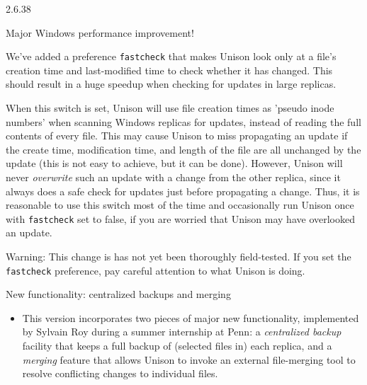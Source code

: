 \begin{changesfromversion}{2.6.38}
\item Major Windows performance improvement!  

We've added a preference \verb|fastcheck| that makes Unison look only at
a file's creation time and last-modified time to check whether it has
changed.  This should result in a huge speedup when checking for updates
in large replicas.

  When this switch is set, Unison will use file creation times as 
  'pseudo inode numbers' when scanning Windows replicas for updates, 
  instead of reading the full contents of every file.  This may cause 
  Unison to miss propagating an update if the create time, 
  modification time, and length of the file are all unchanged by 
  the update (this is not easy to achieve, but it can be done).  
  However, Unison will never {\em overwrite} such an update with
  a change from the other replica, since it 
  always does a safe check for updates just before propagating a 
  change.  Thus, it is reasonable to use this switch most of the time 
  and occasionally run Unison once with {\tt fastcheck} set to false, 
  if you are worried that Unison may have overlooked an update.

  Warning: This change is has not yet been thoroughly field-tested.  If you 
  set the \verb|fastcheck| preference, pay careful attention to what
  Unison is doing.

\item New functionality: centralized backups and merging 
\begin{itemize}
\item This version incorporates two pieces of major new functionality,
   implemented by Sylvain Roy during a summer internship at Penn: a
   {\em centralized backup} facility that keeps a full backup of
   (selected files 
   in) each replica, and a {\em merging} feature that allows Unison to
   invoke an external file-merging tool to resolve conflicting changes to
   individual files.
 

\end{itemize}
\end{changesfromversion}
